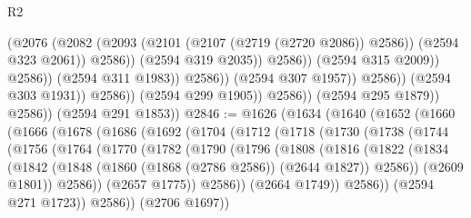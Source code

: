 \begin{lexlean}{R2}
\begin{coremodule}
                                                (@2076
                                                  (@2082
                                                    (@2093
                                                      (@2101 (@2107 (@2719 (@2720 @2086)) @2586))
                                                      (@2594 @323 @2061))
                                                    @2586))
                                                (@2594 @319 @2035))
                                              @2586))
                                          (@2594 @315 @2009))
                                        @2586))
                                    (@2594 @311 @1983))
                                  @2586))
                              (@2594 @307 @1957))
                            @2586))
                        (@2594 @303 @1931))
                      @2586))
                  (@2594 @299 @1905))
                @2586))
            (@2594 @295 @1879))
          @2586))
      (@2594 @291 @1853))
@2846 := @1626
    (@1634
      (@1640
        (@1652
          (@1660
            (@1666
              (@1678
                (@1686
                  (@1692
                    (@1704
                      (@1712
                        (@1718
                          (@1730
                            (@1738
                              (@1744
                                (@1756
                                  (@1764
                                    (@1770
                                      (@1782
                                        (@1790
                                          (@1796
                                            (@1808
                                              (@1816
                                                (@1822
                                                  (@1834
                                                    (@1842
                                                      (@1848
                                                        (@1860 (@1868 (@2786 @2586)) (@2644 @1827))
                                                        @2586))
                                                    (@2609 @1801))
                                                  @2586))
                                              (@2657 @1775))
                                            @2586))
                                        (@2664 @1749))
                                      @2586))
                                  (@2594 @271 @1723))
                                @2586))
                            (@2706 @1697))

\end{coremodule}
\end{lexlean}
